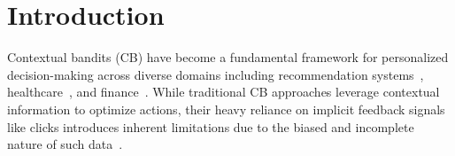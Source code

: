 



\section{Introduction}
\label{sec:introduction }

Contextual bandits (CB) have become a fundamental framework for personalized decision-making across diverse domains including recommendation systems~\citep{li2010contextual,bouneffouf2020survey}, healthcare~\citep{yu2024careforme}, and finance~\citep{zhu2021online}. While traditional CB approaches leverage contextual information to optimize actions, their heavy reliance on implicit feedback signals like clicks introduces inherent limitations due to the biased and incomplete nature of such data~\citep{qi2018bandit}.

